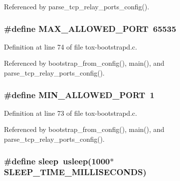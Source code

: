 Referenced by parse\+\_\+tcp\+\_\+relay\+\_\+ports\+\_\+config().

\hypertarget{tox-bootstrapd_8c_a83828e6f5b4b788b1781b298a3a221cd}{
\subsubsection[{M\+A\+X\+\_\+\+A\+L\+L\+O\+W\+E\+D\+\_\+\+P\+O\+R\+T}]{\setlength{\rightskip}{0pt plus 5cm}\#define M\+A\+X\+\_\+\+A\+L\+L\+O\+W\+E\+D\+\_\+\+P\+O\+R\+T~65535}}\label{tox-bootstrapd_8c_a83828e6f5b4b788b1781b298a3a221cd}


Definition at line 74 of file tox-\/bootstrapd.\+c.



Referenced by bootstrap\+\_\+from\+\_\+config(), main(), and parse\+\_\+tcp\+\_\+relay\+\_\+ports\+\_\+config().

\hypertarget{tox-bootstrapd_8c_a3ef213aa33f9321104faf75dfe823623}{
\subsubsection[{M\+I\+N\+\_\+\+A\+L\+L\+O\+W\+E\+D\+\_\+\+P\+O\+R\+T}]{\setlength{\rightskip}{0pt plus 5cm}\#define M\+I\+N\+\_\+\+A\+L\+L\+O\+W\+E\+D\+\_\+\+P\+O\+R\+T~1}}\label{tox-bootstrapd_8c_a3ef213aa33f9321104faf75dfe823623}


Definition at line 73 of file tox-\/bootstrapd.\+c.



Referenced by bootstrap\+\_\+from\+\_\+config(), main(), and parse\+\_\+tcp\+\_\+relay\+\_\+ports\+\_\+config().

\hypertarget{tox-bootstrapd_8c_acc8612feeec5f569b1e096e3110d0dca}{
\subsubsection[{sleep}]{\setlength{\rightskip}{0pt plus 5cm}\#define sleep~usleep(1000$\ast${\bf S\+L\+E\+E\+P\+\_\+\+T\+I\+M\+E\+\_\+\+M\+I\+L\+L\+I\+S\+E\+C\+O\+N\+D\+S})}}\label{tox-bootstrapd_8c_acc8612feeec5f569b1e096e3110d0dca}


